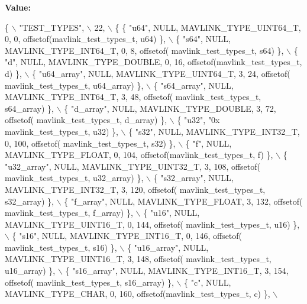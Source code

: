 {\bfseries Value\+:}
\begin{DoxyCode}
\{ \(\backslash\)
    \textcolor{stringliteral}{"TEST\_TYPES"}, \(\backslash\)
    22, \(\backslash\)
    \{  \{ \textcolor{stringliteral}{"u64"}, NULL, MAVLINK_TYPE_UINT64_T, 0, 0, offsetof(mavlink_test_types_t, u64) \}, \(\backslash\)
         \{ \textcolor{stringliteral}{"s64"}, NULL, MAVLINK_TYPE_INT64_T, 0, 8, offsetof(
      mavlink_test_types_t, s64) \}, \(\backslash\)
         \{ \textcolor{stringliteral}{"d"}, NULL, MAVLINK_TYPE_DOUBLE, 0, 16, offsetof(mavlink_test_types_t, d) \}, \(\backslash\)
         \{ \textcolor{stringliteral}{"u64\_array"}, NULL, MAVLINK_TYPE_UINT64_T, 3, 24, offsetof(
      mavlink_test_types_t, u64\_array) \}, \(\backslash\)
         \{ \textcolor{stringliteral}{"s64\_array"}, NULL, MAVLINK_TYPE_INT64_T, 3, 48, offsetof(
      mavlink_test_types_t, s64\_array) \}, \(\backslash\)
         \{ \textcolor{stringliteral}{"d\_array"}, NULL, MAVLINK_TYPE_DOUBLE, 3, 72, offsetof(
      mavlink_test_types_t, d\_array) \}, \(\backslash\)
         \{ \textcolor{stringliteral}{"u32"}, \textcolor{stringliteral}{"0x%
      mavlink_test_types_t, u32) \}, \(\backslash\)
         \{ \textcolor{stringliteral}{"s32"}, NULL, MAVLINK_TYPE_INT32_T, 0, 100, offsetof(
      mavlink_test_types_t, s32) \}, \(\backslash\)
         \{ \textcolor{stringliteral}{"f"}, NULL, MAVLINK_TYPE_FLOAT, 0, 104, offsetof(mavlink_test_types_t, f) \}, \(\backslash\)
         \{ \textcolor{stringliteral}{"u32\_array"}, NULL, MAVLINK_TYPE_UINT32_T, 3, 108, offsetof(
      mavlink_test_types_t, u32\_array) \}, \(\backslash\)
         \{ \textcolor{stringliteral}{"s32\_array"}, NULL, MAVLINK_TYPE_INT32_T, 3, 120, offsetof(
      mavlink_test_types_t, s32\_array) \}, \(\backslash\)
         \{ \textcolor{stringliteral}{"f\_array"}, NULL, MAVLINK_TYPE_FLOAT, 3, 132, offsetof(
      mavlink_test_types_t, f\_array) \}, \(\backslash\)
         \{ \textcolor{stringliteral}{"u16"}, NULL, MAVLINK_TYPE_UINT16_T, 0, 144, offsetof(
      mavlink_test_types_t, u16) \}, \(\backslash\)
         \{ \textcolor{stringliteral}{"s16"}, NULL, MAVLINK_TYPE_INT16_T, 0, 146, offsetof(
      mavlink_test_types_t, s16) \}, \(\backslash\)
         \{ \textcolor{stringliteral}{"u16\_array"}, NULL, MAVLINK_TYPE_UINT16_T, 3, 148, offsetof(
      mavlink_test_types_t, u16\_array) \}, \(\backslash\)
         \{ \textcolor{stringliteral}{"s16\_array"}, NULL, MAVLINK_TYPE_INT16_T, 3, 154, offsetof(
      mavlink_test_types_t, s16\_array) \}, \(\backslash\)
         \{ \textcolor{stringliteral}{"c"}, NULL, MAVLINK_TYPE_CHAR, 0, 160, offsetof(mavlink_test_types_t, c) \}, \(\backslash\)
}
\end{DoxyCode}
